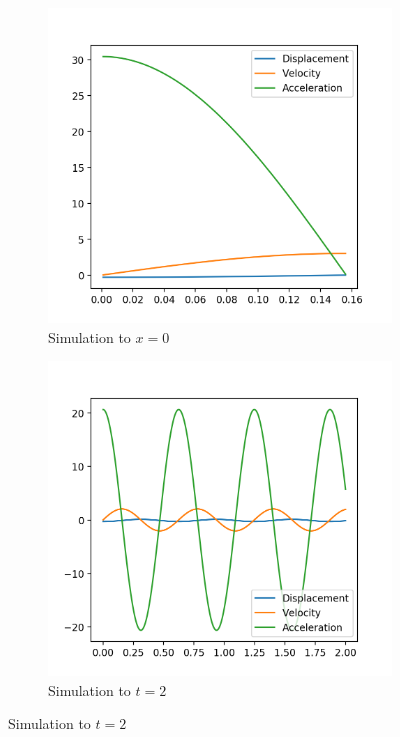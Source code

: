\documentclass[12pt, letterpaper]{article}
\begin{document}
\begin{figure}[h]
  \caption{Simple Harmonic Motion}
  \centering
  \begin{subfigure}[b]{.35\linewidth}
    \includegraphics[width=\linewidth]{Hooke/hooke7000-0_3.png}
    \caption{Simulation to $x=0$}
    \label{fig:short}
  \end{subfigure}
  \begin{subfigure}[b]{.35\linewidth}
    \includegraphics[width=\linewidth]{Hooke/hooke_shm.png}
    \caption{Simulation to $t=2$}
    \label{fig:shm}
  \end{subfigure}
\end{figure}
\end{document}
